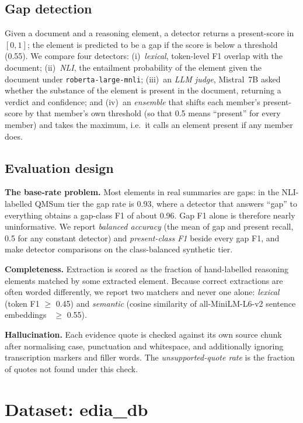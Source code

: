 \documentclass[conference]{IEEEtran}
\begin{document}
\subsection{Gap detection}
Given a document and a reasoning element, a detector returns a present-score in
$[0,1]$; the element is predicted to be a gap if the score is below a threshold
(0.55). We compare four detectors: (i)~\emph{lexical}, token-level F1 overlap
with the document; (ii)~\emph{NLI}, the entailment probability of the element
given the document under \texttt{roberta-large-mnli}; (iii)~an \emph{LLM judge},
Mistral~7B asked whether the substance of the element is present in the
document, returning a verdict and confidence; and (iv)~an \emph{ensemble} that
shifts each member's present-score by that member's own threshold (so that 0.5
means ``present'' for every member) and takes the maximum, i.e.\ it calls an
element present if any member does.

\subsection{Evaluation design}
\textbf{The base-rate problem.} Most elements in real summaries are gaps: in the
NLI-labelled QMSum tier the gap rate is 0.93, where a detector that answers
``gap'' to everything obtains a gap-class F1 of about 0.96. Gap F1 alone is
therefore nearly uninformative. We report \emph{balanced accuracy} (the mean of
gap and present recall, 0.5 for any constant detector) and \emph{present-class F1}
beside every gap F1, and make detector comparisons on the class-balanced
synthetic tier.

\textbf{Completeness.} Extraction is scored as the fraction of hand-labelled
reasoning elements matched by some extracted element. Because correct
extractions are often worded differently, we report two matchers and never one
alone: \emph{lexical} (token F1 $\geq$ 0.45) and \emph{semantic} (cosine
similarity of all-MiniLM-L6-v2 sentence embeddings~\cite{reimers2019sbert}
$\geq$ 0.55).

\textbf{Hallucination.} Each evidence quote is checked against its own source
chunk after normalising case, punctuation and whitespace, and additionally
ignoring transcription markers and filler words. The \emph{unsupported-quote
rate} is the fraction of quotes not found under this check.

\section{Dataset: edia\_db}
\end{document}
